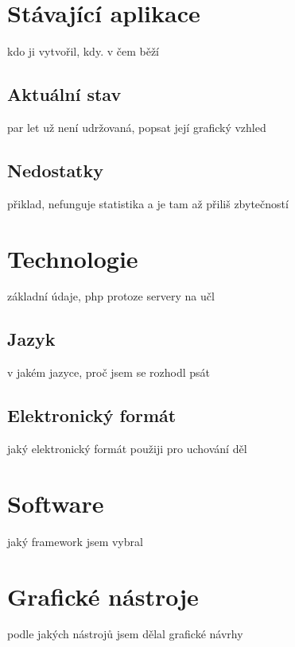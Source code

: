     \section{Stávající aplikace}
        kdo ji vytvořil, kdy. v čem běží
        
        \subsection{Aktuální stav}
            par let už není udržovaná, popsat její grafický vzhled
            
        \subsection{Nedostatky}
            přiklad, nefunguje statistika a je tam až přiliš zbytečností
            
    \section{Technologie}
        základní údaje, php protoze servery na učl
        \subsection{Jazyk}
            v jakém jazyce, proč jsem se rozhodl psát
        \subsection{Elektronický formát}
            jaký elektronický formát použiji pro uchování děl
    \section{Software}
        jaký framework jsem vybral
    \section{Grafické nástroje}
        podle jakých nástrojů jsem dělal grafické návrhy
